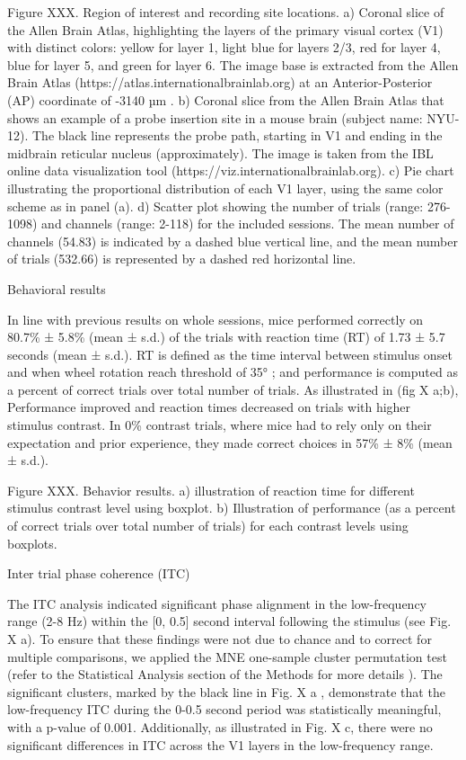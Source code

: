\documentclass[
  letterpaper,
  DIV=11,
  numbers=noendperiod]{scrartcl}
\begin{document}
Figure XXX. Region of interest and recording site locations. a) Coronal
slice of the Allen Brain Atlas, highlighting the layers of the primary
visual cortex (V1) with distinct colors: yellow for layer 1, light blue
for layers 2/3, red for layer 4, blue for layer 5, and green for layer
6. The image base is extracted from the Allen Brain Atlas
(https://atlas.internationalbrainlab.org) at an Anterior-Posterior (AP)
coordinate of -3140 µm . b) Coronal slice from the Allen Brain Atlas
that shows an example of a probe insertion site in a mouse brain
(subject name: NYU-12). The black line represents the probe path,
starting in V1 and ending in the midbrain reticular nucleus
(approximately). The image is taken from the IBL online data
visualization tool (https://viz.internationalbrainlab.org). c) Pie chart
illustrating the proportional distribution of each V1 layer, using the
same color scheme as in panel (a). d) Scatter plot showing the number of
trials (range: 276-1098) and channels (range: 2-118) for the included
sessions. The mean number of channels (54.83) is indicated by a dashed
blue vertical line, and the mean number of trials (532.66) is
represented by a dashed red horizontal line.

Behavioral results

In line with previous results on whole sessions, mice performed
correctly on 80.7\% ± 5.8\% (mean ± s.d.) of the trials with reaction
time (RT) of 1.73 ± 5.7 seconds (mean ± s.d.). RT is defined as the time
interval between stimulus onset and when wheel rotation reach threshold
of 35° ; and performance is computed as a percent of correct trials over
total number of trials. As illustrated in (fig X a;b), Performance
improved and reaction times decreased on trials with higher stimulus
contrast. In 0\% contrast trials, where mice had to rely only on their
expectation and prior experience, they made correct choices in 57\% ±
8\% (mean ± s.d.).

Figure XXX. Behavior results. a) illustration of reaction time for
different stimulus contrast level using boxplot. b) Illustration of
performance (as a percent of correct trials over total number of trials)
for each contrast levels using boxplots.

Inter trial phase coherence (ITC)

The ITC analysis indicated significant phase alignment in the
low-frequency range (2-8 Hz) within the {[}0, 0.5{]} second interval
following the stimulus (see Fig. X a). To ensure that these findings
were not due to chance and to correct for multiple comparisons, we
applied the MNE one-sample cluster permutation test (refer to the
Statistical Analysis section of the Methods for more details ). The
significant clusters, marked by the black line in Fig. X a , demonstrate
that the low-frequency ITC during the 0-0.5 second period was
statistically meaningful, with a p-value of 0.001. Additionally, as
illustrated in Fig. X c, there were no significant differences in ITC
across the V1 layers in the low-frequency range.
\end{document}
